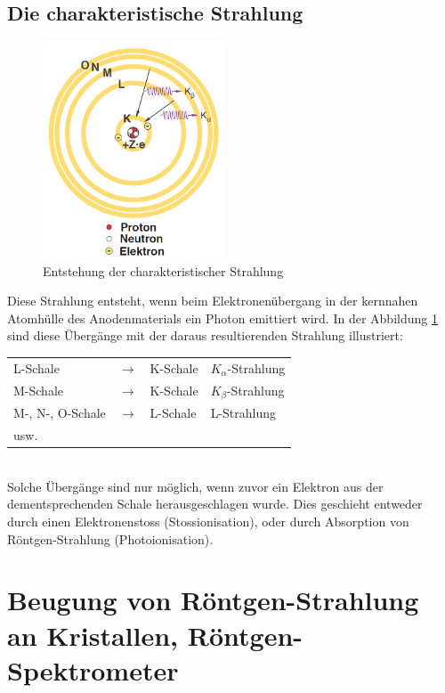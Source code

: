 \subsection{Die charakteristische Strahlung}
\begin{figure}
\centering
\includegraphics[width=0.48\textwidth]{Bilder/atommodell.png} 
\caption{Entstehung der charakteristischer Strahlung}
\vspace{-6cm}
\label{fig:charStrahlung}
\end{figure}
Diese Strahlung entsteht, wenn beim Elektronenübergang in der kernnahen Atomhülle des Anodenmaterials ein Photon emittiert wird. In der Abbildung \ref{fig:charStrahlung} sind diese Übergänge mit der daraus resultierenden Strahlung illustriert:
\\[0.5cm]
\begin{tabular}{llll}
L-Schale & $\rightarrow$ & K-Schale & $K_{\alpha}$-Strahlung \\ 
M-Schale & $\rightarrow$ & K-Schale & $K_{\beta}$-Strahlung \\ 
M-, N-, O-Schale & $\rightarrow$ & L-Schale & L-Strahlung \\ 
\multicolumn{4}{l}{usw.} \\ 
\end{tabular}
\\[0.5cm]
Solche Übergänge sind nur möglich, wenn zuvor ein Elektron aus der dementsprechenden Schale \glqq herausgeschlagen\grqq\; wurde. Dies geschieht entweder durch einen Elektronenstoss (Stossionisation), oder durch Absorption von Röntgen-Strahlung (Photoionisation).\\
\vspace*{3cm}
\section{Beugung von Röntgen-Strahlung an Kristallen, Röntgen-Spektrometer}
